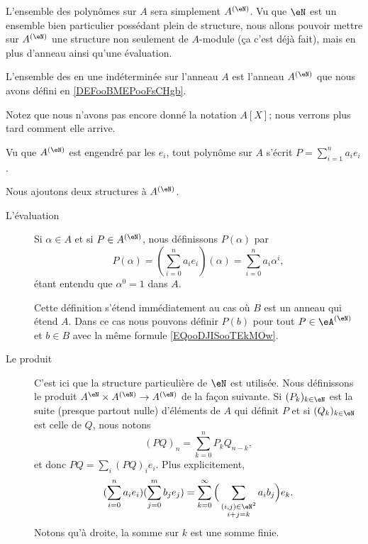 L'ensemble des polynômes sur \( A\) sera simplement \( A^{(\eN)}\). Vu que \( \eN\) est un ensemble bien particulier possédant plein de structure, nous allons pouvoir mettre sur \( A^{(\eN)}\) une structure non seulement de \( A\)-module (ça c'est déjà fait), mais en plus d'anneau ainsi qu'une évaluation.
\begin{definition}      \label{DEFooFYZRooMikwEL}
    L'ensemble des  en une indéterminée sur l'anneau \( A\) est l'anneau \( A^{(\eN)}\) que nous avons défini en \ref{DEFooBMEPooFsCHgb}.
\end{definition}

Notez que nous n'avons pas encore donné la notation \( A[X]\); nous verrons plus tard comment elle arrive. 

Vu que \( A^{(\eN)}\) est engendré par les \( e_i\), tout polynôme sur \( A\) s'écrit \( P=\sum_{i=1}^na_ie_i\).

\begin{definition}      \label{DEFooNXKUooLrGeuh}
    Nous ajoutons deux structures à \( A^{(\eN)}\).
    \begin{description}
        \item[L'évaluation] Si \( \alpha\in A\) et si \( P\in A^{(\eN)}\), nous définissons \( P(\alpha)\) par
            \begin{equation}        \label{EQooDJISooTEkMOw}
                P(\alpha)=(\sum_{i=0}^{n}a_ie_i)(\alpha)=\sum_{i=0}^na_i\alpha^i,
            \end{equation}
            étant entendu que \( \alpha^0=1\) dans \( A\).

            Cette définition s'étend immédiatement au cas où \( B\) est un anneau qui étend \( A\). Dans ce cas nous pouvons définir \( P(b)\) pour tout \( P\in \eA^{(\eN)}\) et \( b\in B\) avec la même formule \eqref{EQooDJISooTEkMOw}.
        \item[Le produit] C'est ici que la structure particulière de \( \eN\) est utilisée. Nous définissons le produit \( A^{\eN}\times A^{(\eN)}\to A^{(\eN)}\) de la façon suivante. Si \( (P_k)_{k\in \eN}\) est la suite (presque partout nulle) d'éléments de \( A\) qui définit \( P\) et si \( (Q_k)_{k\in \eN}\) est celle de \( Q\), nous notons
        \begin{equation}    \label{EQooTNCSooKklisb}
            (PQ)_n=\sum_{k=0}^nP_kQ_{n-k},
        \end{equation}
        et donc \( PQ=\sum_i(PQ)_ie_i\). Plus explicitement,
        \begin{equation}    \label{EQooCIBUooAgpxjL}
            (\sum_{i=0}^na_ie_i)(\sum_{j=0}^mb_je_j)=\sum_{k=0}^{\infty}\Big( \sum_{\substack{  (i,j)\in \eN^2 \\i+j=k}}a_ib_j \Big)e_k.
        \end{equation}
        Notons qu'à droite, la somme sur \( k\) est une somme finie.
    \end{description}
\end{definition}

